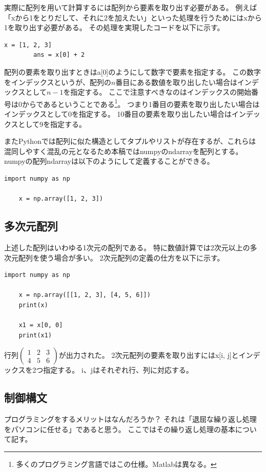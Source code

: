 \documentclass[]{ltjsarticle}
\begin{document}
	実際に配列を用いて計算するには配列から要素を取り出す必要がある。
	例えば「xから1をとりだして、それに2を加えたい」といった処理を行うためにはxから1を取り出す必要がある。
	その処理を実現したコードを以下に示す。
	\begin{lstlisting}[caption=array.py, label=array2]
		x = [1, 2, 3]
		ans = x[0] + 2
	\end{lstlisting}
	配列の要素を取り出すときはa[0]のようにして数字で要素を指定する。
	この数字をインデックスというが、配列の$n$番目にある数値を取り出したい場合はインデックスとして$n-1$を指定する。
	ここで注意すべきなのはインデックスの開始番号は0からであるということである\footnote{多くのプログラミング言語ではこの仕様。Matlabは異なる。}。
	つまり1番目の要素を取り出したい場合はインデックスとして0を指定する。
	10番目の要素を取り出したい場合はインデックスとして9を指定する。

	またPythonでは配列に似た構造としてタプルやリストが存在するが、これらは混同しやすく混乱の元となるため本稿ではnumpyのndarrayを配列とする。
	numpyの配列ndarrayは以下のようにして定義することができる。
	\begin{lstlisting}[caption=numpyarray.py, label=ndarray]
	import numpy as np

	x = np.array([1, 2, 3])
	\end{lstlisting}

	\subsection{多次元配列}
	上述した配列はいわゆる1次元の配列である。
	特に数値計算では2次元以上の多次元配列を使う場合が多い。
	2次元配列の定義の仕方を以下に示す。
	\begin{lstlisting}[caption=2darray.py, label=2darray]
	import numpy as np

	x = np.array([[1, 2, 3], [4, 5, 6]])
	print(x)

	x1 = x[0, 0]
	print(x1)
	\end{lstlisting}
	行列$\begin{pmatrix} 1 & 2 & 3 \\ 4 & 5 & 6 \end{pmatrix}$が出力された。
	2次元配列の要素を取り出すにはx[i, j]とインデックスを2つ指定する。
	i、jはそれぞれ行、列に対応する。

	\subsection{制御構文}
	プログラミングをするメリットはなんだろうか？
	それは「退屈な繰り返し処理をパソコンに任せる」であると思う。
	ここではその繰り返し処理の基本について記す。
\end{document}
